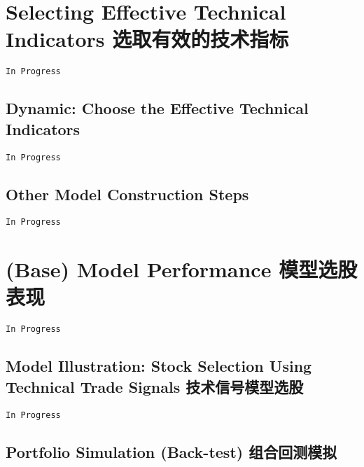 \documentclass[
]{book}
\begin{document}
\hypertarget{selecting-effective-technical-indicators-ux9009ux53d6ux6709ux6548ux7684ux6280ux672fux6307ux6807}{%
\chapter{Selecting Effective Technical Indicators
选取有效的技术指标}\label{selecting-effective-technical-indicators-ux9009ux53d6ux6709ux6548ux7684ux6280ux672fux6307ux6807}}

\texttt{In\ Progress}

\hypertarget{dynamic-choose-the-effective-technical-indicators}{%
\section{Dynamic: Choose the Effective Technical
Indicators}\label{dynamic-choose-the-effective-technical-indicators}}

\texttt{In\ Progress}

\hypertarget{other-model-construction-steps}{%
\section{Other Model Construction
Steps}\label{other-model-construction-steps}}

\texttt{In\ Progress}

\hypertarget{base-model-performance-ux6a21ux578bux9009ux80a1ux8868ux73b0}{%
\chapter{(Base) Model Performance
模型选股表现}\label{base-model-performance-ux6a21ux578bux9009ux80a1ux8868ux73b0}}

\texttt{In\ Progress}

\hypertarget{model-illustration-stock-selection-using-technical-trade-signals-ux6280ux672fux4fe1ux53f7ux6a21ux578bux9009ux80a1}{%
\section{Model Illustration: Stock Selection Using Technical Trade
Signals
技术信号模型选股}\label{model-illustration-stock-selection-using-technical-trade-signals-ux6280ux672fux4fe1ux53f7ux6a21ux578bux9009ux80a1}}

\texttt{In\ Progress}

\hypertarget{portfolio-simulation-back-test-ux7ec4ux5408ux56deux6d4bux6a21ux62df}{%
\section{Portfolio Simulation (Back-test)
组合回测模拟}\label{portfolio-simulation-back-test-ux7ec4ux5408ux56deux6d4bux6a21ux62df}}
\end{document}
